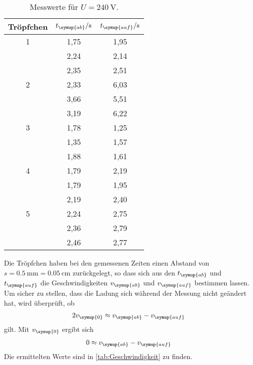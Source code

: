 \begin{table}
  \centering
  \caption{Messwerte für $U=\SI{240}{\volt}$.}
  \label{tab:t5}
  \begin{tabular}{c c c}
    \toprule
    Tröpfchen & $t_{\symup{ab}}/\unit{\second}$ & $t_{\symup{auf}}/\unit{\second}$ \\
    \midrule
    1 & 1,75 & 1,95 \\
      & 2,24 & 2,14 \\
      & 2,35 & 2,51 \\
    2 & 2,33 & 6,03 \\
      & 3,66 & 5,51 \\
      & 3,19 & 6,22 \\
    3 & 1,78 & 1,25 \\
      & 1,35 & 1,57 \\
      & 1,88 & 1,61 \\
    4 & 1,79 & 2,19 \\
      & 1,79 & 1,95 \\
      & 2,19 & 2,40 \\
    5 & 2,24 & 2,75 \\
      & 2,36 & 2,79 \\
      & 2,46 & 2,77 \\
    \bottomrule
  \end{tabular}
\end{table}
Die Tröpfchen haben bei den gemessenen Zeiten einen Abstand von $s=\SI{0,5}{\milli\meter} = \SI{0,05}{\centi\meter}$
zurückgelegt, so dass sich aus den $t_{\symup{ab}}$ und $t_{\symup{auf}}$ die Geschwindigkeiten $v_{\symup{ab}}$ und
$v_{\symup{auf}}$ bestimmen lassen. Um sicher zu stellen, dass die Ladung sich während der Messung nicht
geändert hat, wird überprüft, ob
\begin{align*}
  2v_{\symup{0}} \approx v_{\symup{ab}} - v_{\symup{auf}}
\end{align*}
gilt. Mit $v_{\symup{0}}$ ergibt sich
\begin{align*}
  0 \approx v_{\symup{ab}} - v_{\symup{auf}}
\end{align*}
Die ermittelten Werte sind in \autoref{tab:Geschwindigkeit} zu finden.


